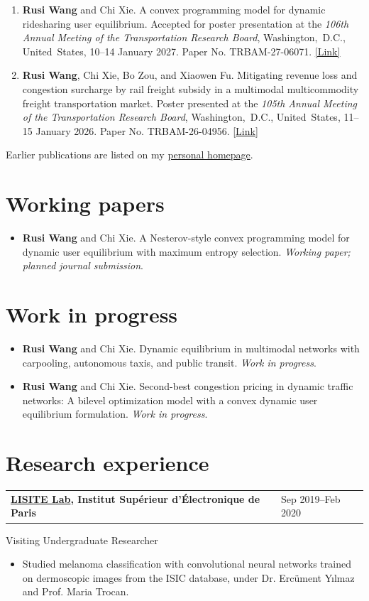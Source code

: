 \documentclass[11pt,letterpaper]{article}
\makeatletter
\newcommand{\subhead}[1]{\vspace{3pt}{\bfseries #1}\par\vspace{1pt}}
\newcommand{\dated}[2]{%
  \noindent\begin{tabularx}{\linewidth}{@{}X@{\hspace{9pt}}>{\raggedleft\arraybackslash}p{.24\linewidth}@{}}
  #1 & #2
  \end{tabularx}\par
}
\makeatother
\begin{document}
\subhead{Conference papers}
\begin{enumerate}
  \item \textbf{Rusi Wang} and Chi Xie. A convex programming model for dynamic ridesharing user equilibrium. Accepted for poster presentation at the \textit{106th Annual Meeting of the Transportation Research Board}, \mbox{Washington, D.C.}, \mbox{United States}, 10--14 January 2027. Paper No. TRBAM-27-06071. \href{https://annualmeeting.mytrb.org/OnlineProgram/Details/26428}{[Link]}
  \item \textbf{Rusi Wang}, Chi Xie, Bo Zou, and Xiaowen Fu. Mitigating revenue loss and congestion surcharge by rail freight subsidy in a multimodal multicommodity freight transportation market. Poster presented at the \textit{105th Annual Meeting of the Transportation Research Board}, \mbox{Washington, D.C.}, \mbox{United States}, 11--15 January 2026. Paper No. TRBAM-26-04956. \href{https://annualmeeting.mytrb.org/OnlineProgramArchive/Details/24895}{[Link]}
\end{enumerate}
Earlier publications are listed on my \href{https://rusiwang99.github.io/publications/}{personal homepage}.

\newpage
\section*{Working papers}
\begin{itemize}
  \item \textbf{Rusi Wang} and Chi Xie. A Nesterov-style convex programming model for dynamic user equilibrium with maximum entropy selection. \textit{Working paper; planned journal submission}.
\end{itemize}

\section*{Work in progress}
\begin{itemize}
  \item \textbf{Rusi Wang} and Chi Xie. Dynamic equilibrium in multimodal networks with carpooling, autonomous taxis, and public transit. \textit{Work in progress}.
  \item \textbf{Rusi Wang} and Chi Xie. Second-best congestion pricing in dynamic traffic networks: A bilevel optimization model with a convex dynamic user equilibrium formulation. \textit{Work in progress}.
\end{itemize}

\section*{Research experience}
\dated{\textbf{\href{https://www.isep.fr/en/research-at-isep/}{LISITE Lab}, Institut Sup\'erieur d'\'Electronique de Paris}}{Sep 2019--Feb 2020}
Visiting Undergraduate Researcher
\begin{itemize}
  \item Studied melanoma classification with convolutional neural networks trained on dermoscopic images from the ISIC database, under Dr. Erc\"ument Y\i lmaz and Prof. Maria Trocan.
\end{itemize}
\end{document}
